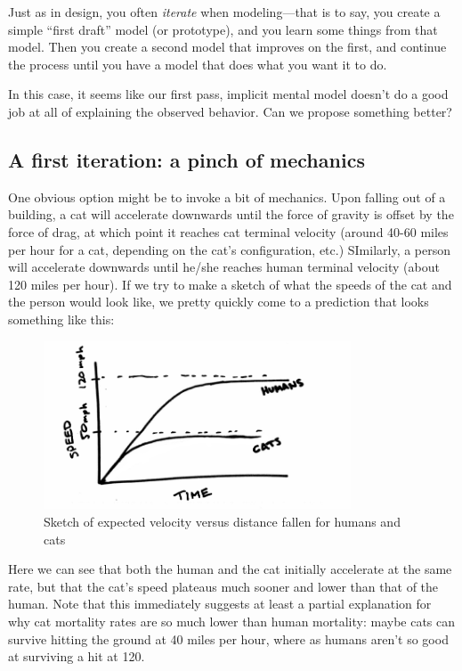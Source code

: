 Just as in design, you often {\it iterate} when modeling---that is to
say, you create a simple ``first draft'' model (or prototype), and you
learn some things from that model.  Then you create a second model
that improves on the first, and continue the process until you have a
model that does what you want it to do.

In this case, it seems like our first pass, implicit mental model
doesn't do a good job at all of explaining the observed behavior.  Can
we propose something better?

\subsection{A first iteration: a pinch of mechanics}

One obvious option might be to invoke a bit of mechanics.  Upon
falling out of a building, a cat will accelerate downwards until the
force of gravity is offset by the force of drag, at which point it
reaches cat terminal velocity (around 40-60 miles per hour for a cat,
depending on the cat's configuration, etc.)  SImilarly, a person will
accelerate downwards until he/she reaches human terminal velocity
(about 120 miles per hour).  If we try to make a sketch of what the
speeds of the cat and the person would look like, we pretty quickly
come to a prediction that looks something like this:

\begin{figure}
\centerline{\includegraphics[height=5cm]{figs/TerminalVelocitySketch}}
\caption{Sketch of expected velocity versus distance fallen for humans and cats}
\end{figure}

Here we can see that both the human and the cat initially accelerate
at the same rate, but that the cat's speed plateaus much sooner and
lower than that of the human.  Note that this immediately suggests at
least a partial explanation for why cat mortality rates are so much
lower than human mortality: maybe cats can survive hitting the ground
at 40 miles per hour, where as humans aren't so good at surviving a
hit at 120.

